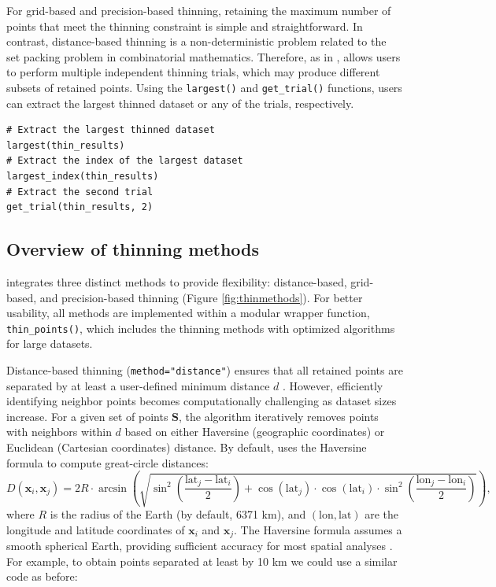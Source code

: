 For grid-based and precision-based thinning, retaining the maximum number of points that meet the thinning constraint is simple and straightforward. In contrast, distance-based thinning is a non-deterministic problem related to the set packing problem in combinatorial mathematics. Therefore, as in ,  allows users to perform multiple independent thinning trials, which may produce different subsets of retained points. Using the \texttt{largest()} and \texttt{get\_trial()} functions, users can extract the largest thinned dataset or any of the trials, respectively.

\begin{verbatim}
# Extract the largest thinned dataset
largest(thin_results)
# Extract the index of the largest dataset
largest_index(thin_results)
# Extract the second trial
get_trial(thin_results, 2)
\end{verbatim}

\subsection{Overview of thinning methods}\label{overview-of-thinning-methods}

 integrates three distinct methods to provide flexibility: distance-based, grid-based, and precision-based thinning (Figure \ref{fig:thinmethods}). For better usability, all methods are implemented within a modular wrapper function, \texttt{thin\_points()}, which includes the thinning methods with optimized algorithms for large datasets.

Distance-based thinning (\texttt{method="distance"}) ensures that all retained points are separated by at least a user-defined minimum distance \(d\) \citep{aiello2015spthin}. However, efficiently identifying neighbor points becomes computationally challenging as dataset sizes increase. For a given set of points \(\mathbf{S}\), the algorithm iteratively removes points with neighbors within \(d\) based on either Haversine (geographic coordinates) or Euclidean (Cartesian coordinates) distance. By default,  uses the Haversine formula \citep{chopde2013landmark} to compute great-circle distances:
\begin{equation}
D(\mathbf{x}_i, \mathbf{x}_j) = 2R \cdot \arcsin \left( \sqrt{\sin^2 \left( \frac{\text{lat}_j - \text{lat}_i}{2} \right) + \cos(\text{lat}_j) \cdot \cos(\text{lat}_i) \cdot \sin^2 \left( \frac{\text{lon}_j - \text{lon}_i}{2} \right)} \right),
  \label{eq:haversine}
\end{equation}
where \(R\) is the radius of the Earth (by default, 6371 km), and \((\text{lon}, \text{lat})\) are the longitude and latitude coordinates of \(\mathbf{x}_i\) and \(\mathbf{x}_j\). The Haversine formula assumes a smooth spherical Earth, providing sufficient accuracy for most spatial analyses \citep{maria2020measure}. For example, to obtain points separated at least by 10 km we could use a similar code as before:


